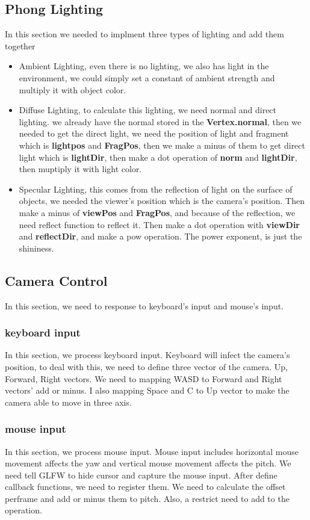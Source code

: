 \documentclass[acmtog]{acmart}
\begin{document}
\subsection{Phong Lighting}
	In this section we needed to implment three types of lighting and add them together
	\begin{itemize}
		\item Ambient Lighting, even there is no lighting, we also has light in the environment,
			we could simply set a constant of ambient strength and multiply it with object color.
		\item Diffuse Lighting, to calculate this lighting, we need normal and direct lighting.
			we already have the normal stored in the \textbf{Vertex.normal}, 
			then we needed to get the direct light, we need the position of light and fragment
			which is \textbf{lightpos} and \textbf{FragPos}, then we make a minus of them to get
			direct light which is \textbf{lightDir}, then make a dot operation of \textbf{norm} and \textbf{lightDir},
			then muptiply it with light color.
		\item Specular Lighting, this comes from the reflection of light on the surface of objects,
			we needed the viewer's position which is the camera's position. Then make a minus of \textbf{viewPos} and \textbf{FragPos},
			and because of the reflection, we need reflect function to reflect it.
			Then make a dot operation with \textbf{viewDir} and \textbf{reflectDir}, and make a pow operation.
			The power exponent, is just the shininess.
	\end{itemize}
\subsection{Camera Control}
	In this section, we need to response to keyboard's input and mouse's input.
	\subsubsection{keyboard input}
		In this section, we process keyboard input. Keyboard will infect the camera's position,
		to deal with this, we need to define three vector of the camera. Up, Forward, Right vectors.
		We need to mapping WASD to Forward and Right vectors' add or minus. I also mapping Space and C
		to Up vector to make the camera able to move in three axis.
	\subsubsection{mouse input}
		In this section, we process mouse input. Mouse input includes horizontal mouse movement affects the yaw and vertical mouse movement affects the pitch.
		We need tell GLFW to hide cursor and capture the mouse input. After define callback functions, we need to register them.
		We need to calculate the offset perframe and add or minus them to pitch. Also, a restrict need to add to the operation.
\end{document}
